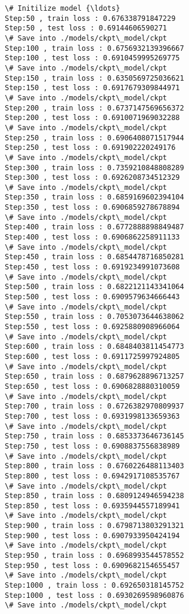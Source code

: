 \documentclass[11pt]{article}
\begin{document}
    \begin{Verbatim}[commandchars=\\\{\}]
\# Initilize model {\ldots}
Step:50 , train loss : 0.676338791847229
Step:50 , test loss : 0.69144606590271
\# Save into ./models/ckpt\_model/ckpt
Step:100 , train loss : 0.6756932139396667
Step:100 , test loss : 0.6910459995269775
\# Save into ./models/ckpt\_model/ckpt
Step:150 , train loss : 0.6350569725036621
Step:150 , test loss : 0.6917679309844971
\# Save into ./models/ckpt\_model/ckpt
Step:200 , train loss : 0.6737147569656372
Step:200 , test loss : 0.6910071969032288
\# Save into ./models/ckpt\_model/ckpt
Step:250 , train loss : 0.6906408071517944
Step:250 , test loss : 0.691902220249176
\# Save into ./models/ckpt\_model/ckpt
Step:300 , train loss : 0.7359210848808289
Step:300 , test loss : 0.6926208734512329
\# Save into ./models/ckpt\_model/ckpt
Step:350 , train loss : 0.6859169602394104
Step:350 , test loss : 0.6906859278678894
\# Save into ./models/ckpt\_model/ckpt
Step:400 , train loss : 0.6772888898849487
Step:400 , test loss : 0.6906862258911133
\# Save into ./models/ckpt\_model/ckpt
Step:450 , train loss : 0.6854478716850281
Step:450 , test loss : 0.6919234991073608
\# Save into ./models/ckpt\_model/ckpt
Step:500 , train loss : 0.6822121143341064
Step:500 , test loss : 0.6909579634666443
\# Save into ./models/ckpt\_model/ckpt
Step:550 , train loss : 0.7053073644638062
Step:550 , test loss : 0.6925880908966064
\# Save into ./models/ckpt\_model/ckpt
Step:600 , train loss : 0.6848403811454773
Step:600 , test loss : 0.6911725997924805
\# Save into ./models/ckpt\_model/ckpt
Step:650 , train loss : 0.6879628896713257
Step:650 , test loss : 0.6906828880310059
\# Save into ./models/ckpt\_model/ckpt
Step:700 , train loss : 0.6726382970809937
Step:700 , test loss : 0.6931998133659363
\# Save into ./models/ckpt\_model/ckpt
Step:750 , train loss : 0.6853373646736145
Step:750 , test loss : 0.6908837556838989
\# Save into ./models/ckpt\_model/ckpt
Step:800 , train loss : 0.6760226488113403
Step:800 , test loss : 0.6942917108535767
\# Save into ./models/ckpt\_model/ckpt
Step:850 , train loss : 0.6809124946594238
Step:850 , test loss : 0.6935944557189941
\# Save into ./models/ckpt\_model/ckpt
Step:900 , train loss : 0.6798713803291321
Step:900 , test loss : 0.6907933950424194
\# Save into ./models/ckpt\_model/ckpt
Step:950 , train loss : 0.6968993544578552
Step:950 , test loss : 0.6909682154655457
\# Save into ./models/ckpt\_model/ckpt
Step:1000 , train loss : 0.692650318145752
Step:1000 , test loss : 0.6930269598960876
\# Save into ./models/ckpt\_model/ckpt

\end{Verbatim}
\end{document}
